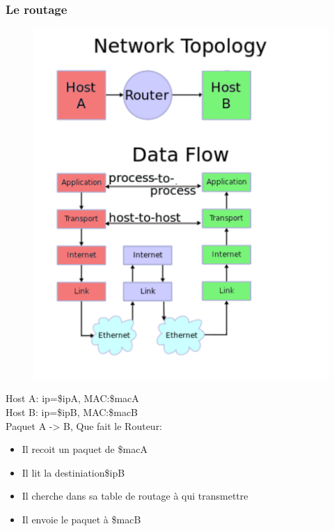 \begin{frame}\frametitle{Le routage}

        \begin{minipage}{0.35\textwidth}
            \begin{figure}[H]
                \includegraphics[scale=0.35]{res/DodConnect.pdf}
            \end{figure}
        \end{minipage} \hfill
        \begin{minipage}{0.5\textwidth}
            {\color{red}Host A: ip=\$ipA, MAC:\$macA}\\
            {\color{green}Host B: ip=\$ipB, MAC:\$macB}\\
             Paquet A -> B, Que fait le Routeur:
            \begin{itemize}
                \item Il recoit un paquet de {\color{red}\$macA}
                \item Il lit la destiniation{\color{green}\$ipB}
                \item Il cherche dans sa table de routage à qui transmettre
                \item Il envoie le paquet à {\color{green}\$macB}
            \end{itemize}

        \end{minipage}

\end{frame}


